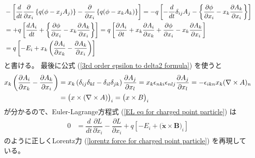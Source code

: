\begin{align}
  &
- \left[
  \dfrac{d}{dt}
    \dfrac{\partial}{\partial \dot{x}_i}
    \left\{
      q(\phi - \dot{x}_j A_j)
    \right\}
  -
    \dfrac{\partial}{\partial x_i}
    \left\{
      q(\phi - \dot{x}_k A_k)
    \right\}
\right]
=
- q \left[
  - \dfrac{d}{dt}
    \delta_{ij} A_j
  -
    \left\{
      \dfrac{\partial \phi}{\partial x_i}
    -
      \dot{x}_k
      \dfrac{\partial A_k}{\partial x_i}
    \right\}
\right]
\notag\\&
=
+ q \left[
  \dfrac{d A_i}{dt}
  +
    \left\{
      \dfrac{\partial \phi}{\partial x_i}
    -
      \dot{x}_k
      \dfrac{\partial A_k}{\partial x_i}
    \right\}
\right]
=
q \left[
    \dfrac{\partial A_i}{\partial t}
  +
    \dot{x}_k
    \dfrac{\partial A_i}{\partial x_k}
  +
    \dfrac{\partial \phi}{\partial x_i}
  -
    \dot{x}_k
    \dfrac{\partial A_k}{\partial x_i}
\right]
\notag\\&
=
q \left[
    - E_i
  +
    \dot{x}_k
    \left(
      \dfrac{\partial A_i}{\partial x_k}
    -
      \dfrac{\partial A_k}{\partial x_i}
    \right)
\right]
\end{align}
と書ける。
最後に公式
(\ref{3rd order epsilon to delta2 formula})
を使うと
\begin{align}
  \dot{x}_k
  \left(
    \dfrac{\partial A_i}{\partial x_k}
  -
    \dfrac{\partial A_k}{\partial x_i}
  \right)
&=
  \dot{x}_k
  \left(
    \delta_{ij} \delta_{kl}
  -
    \delta_{il} \delta_{jk}
  \right)
  \dfrac{\partial A_j}{\partial x_l}
=
  \dot{x}_k
    \epsilon_{nki}
    \epsilon_{nlj}
  \dfrac{\partial A_j}{\partial x_l}
=
  - \epsilon_{ikn}
    \dot{x}_k
  (\nabla \times \bm{A})_n
\notag\\&
=
  \big(
    \dot{\bm{x}}
      \times
    (\nabla \times \bm{A})
  \big)_i
=
  \big(
    \dot{\bm{x}} \times \bm{B}
  \big)_i
\end{align}
が分かるので、Euler-Lagrange方程式
(\ref{EL eq for charged point particle})
は
\begin{align}
  0
&=
  \dfrac{d}{dt}
    \dfrac{\partial L}{\partial \dot{x}_i}
  -
    \dfrac{\partial L}{\partial x_i}
+ q \left[
  - E_i
  +
    \big(
      \dot{\bm{x}} \times \bm{B}
    \big)_i
\right]
\end{align}
のように正しくLorentz力
(\ref{lorentz force for charged point particle})
を再現している。

